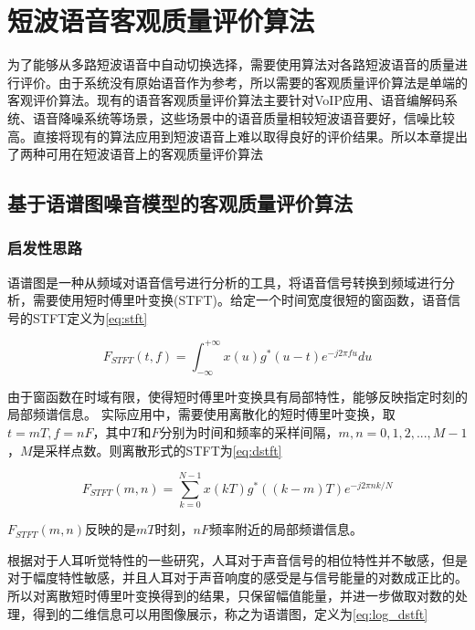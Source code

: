 \chapter{短波语音客观质量评价算法}
\label{chap:algorithms}

为了能够从多路短波语音中自动切换选择，需要使用算法对各路短波语音的质量进行评价。由于系统没有原始语音作为参考，所以需要的客观质量评价算法是单端的客观评价算法。现有的语音客观质量评价算法主要针对VoIP应用、语音编解码系统、语音降噪系统等场景，这些场景中的语音质量相较短波语音要好，信噪比较高。直接将现有的算法应用到短波语音上难以取得良好的评价结果。所以本章提出了两种可用在短波语音上的客观质量评价算法

\section{基于语谱图噪音模型的客观质量评价算法}

\subsection{启发性思路} \label{section:alg1-1}

语谱图是一种从频域对语音信号进行分析的工具，将语音信号转换到频域进行分析，需要使用短时傅里叶变换(STFT)。给定一个时间宽度很短的窗函数，语音信号的STFT定义为\ref{eq:stft}

\begin{equation}\label{eq:stft}
F_{STFT}(t, f) = \int_{-\infty}^{+\infty}x(u)g^*(u-t)e^{-j2\pi fu}du
\end{equation}

由于窗函数在时域有限，使得短时傅里叶变换具有局部特性，能够反映指定时刻的局部频谱信息。
实际应用中，需要使用离散化的短时傅里叶变换，取$t=mT, f=nF$，其中$T$和$F$分别为时间和频率的采样间隔，$m,n=0,1,2,...,M-1$，$M$是采样点数。则离散形式的STFT为\ref{eq:dstft}

\begin{equation}\label{eq:dstft}
F_{STFT}(m, n) = \sum_{k=0}^{N-1}x(kT)g^*((k-m)T)e^{-j2\pi nk/N}
\end{equation}

$F_{STFT}(m, n)$反映的是$mT$时刻，$nF$频率附近的局部频谱信息。

根据对于人耳听觉特性的一些研究，人耳对于声音信号的相位特性并不敏感，但是对于幅度特性敏感，并且人耳对于声音响度的感受是与信号能量的对数成正比的。所以对离散短时傅里叶变换得到的结果，只保留幅值能量，并进一步做取对数的处理，得到的二维信息可以用图像展示，称之为语谱图，定义为\ref{eq:log_dstft}

